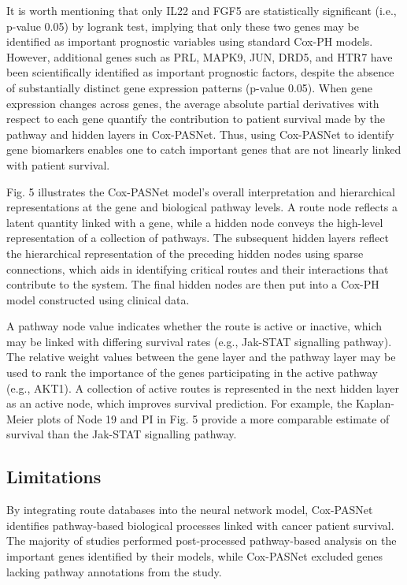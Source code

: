 \documentclass[10pt,twocolumn,twoside,lineno]{gsajnl}
\begin{document}
It is worth mentioning that only IL22 and FGF5 are statistically significant (i.e., p-value 0.05) by logrank test, implying that only these two genes may be identified as important prognostic variables using standard Cox-PH models. However, additional genes such as PRL, MAPK9, JUN, DRD5, and HTR7 have been scientifically identified as important prognostic factors, despite the absence of substantially distinct gene expression patterns (p-value 0.05). When gene expression changes across genes, the average absolute partial derivatives with respect to each gene quantify the contribution to patient survival made by the pathway and hidden layers in Cox-PASNet. Thus, using Cox-PASNet to identify gene biomarkers enables one to catch important genes that are not linearly linked with patient survival.


Fig. 5 illustrates the Cox-PASNet model's overall interpretation and hierarchical representations at the gene and biological pathway levels. A route node reflects a latent quantity linked with a gene, while a hidden node conveys the high-level representation of a collection of pathways. The subsequent hidden layers reflect the hierarchical representation of the preceding hidden nodes using sparse connections, which aids in identifying critical routes and their interactions that contribute to the system. The final hidden nodes are then put into a Cox-PH model constructed using clinical data.



A pathway node value indicates whether the route is active or inactive, which may be linked with differing survival rates (e.g., Jak-STAT signalling pathway). The relative weight values between the gene layer and the pathway layer may be used to rank the importance of the genes participating in the active pathway (e.g., AKT1). A collection of active routes is represented in the next hidden layer as an active node, which improves survival prediction. For example, the Kaplan-Meier plots of Node 19 and PI in Fig. 5 provide a more comparable estimate of survival than the Jak-STAT signalling pathway.

\subsection{Limitations}
By integrating route databases into the neural network model, Cox-PASNet identifies pathway-based biological processes linked with cancer patient survival. The majority of studies performed post-processed pathway-based analysis on the important genes identified by their models, while Cox-PASNet excluded genes lacking pathway annotations from the study.
\end{document}
